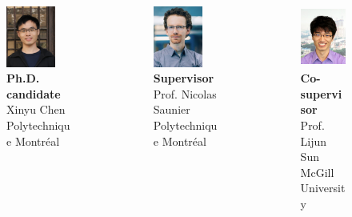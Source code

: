 \documentclass{beamer}
\begin{document}
\begin{frame}[plain]
\begin{center}
\begin{columns}
\begin{column}{0.3\textwidth}
\begin{figure}
    \centering
    \includegraphics[height = 2.0cm]{graphics/xinyu_chen.png}
    \caption*{\centering\scriptsize \textbf{Ph.D. candidate} \\Xinyu Chen\\ Polytechnique Montr\'eal}
\end{figure}
\end{column}
\hspace{-3em}
\begin{column}{0.3\textwidth}
\begin{figure}
    \centering
    \includegraphics[height = 2cm]{graphics/nicolas_saunier.png}
    \caption*{\centering\scriptsize
    \textbf{Supervisor} \\
    Prof. Nicolas Saunier\\ Polytechnique Montr\'eal}
\end{figure}
\end{column}
\hspace{-3em}
\begin{column}{0.3\textwidth}
\begin{figure}
    \centering
    \includegraphics[height = 2cm]{graphics/lijun_sun.jpg}
    \caption*{\centering\scriptsize
    \textbf{Co-supervisor} \\ Prof. Lijun Sun\\ McGill University}
\end{figure}
\end{column}

\end{columns}

\end{center}

\end{frame}
\end{document}

